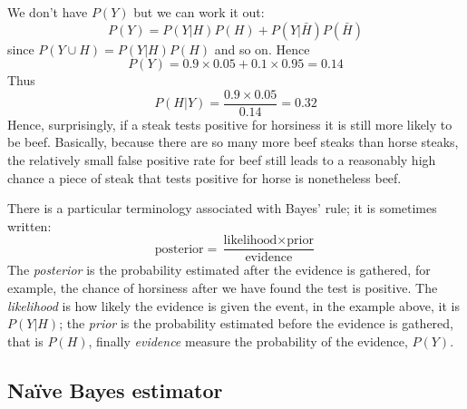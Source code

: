 \documentclass[11pt,a4paper]{scrartcl}
\begin{document}
We don't have $P(Y)$ but we can work it out:
\begin{equation}
P(Y)=P(Y|H)P(H)+P(Y|\bar{H})P(\bar{H})
\end{equation}
since $P(Y\cup H)=P(Y|H)P(H)$ and so on. Hence
\begin{equation}
P(Y)=0.9\times 0.05 + 0.1\times 0.95=0.14
\end{equation}
Thus
\begin{equation}
P(H|Y)=\frac{0.9\times 0.05}{0.14}=0.32
\end{equation}
Hence, surprisingly, if a steak tests positive for horsiness it is
still more likely to be beef. Basically, because there are so many
more beef steaks than horse steaks, the relatively small false
positive rate for beef still leads to a reasonably high chance a piece
of steak that tests positive for horse is nonetheless beef.

There is a particular terminology associated with Bayes' rule; it is
sometimes written:
\begin{equation}
\mbox{posterior}=\frac{\mbox{likelihood}\times \mbox{prior}}{\mbox{evidence}}
\end{equation}
The \textsl{posterior} is the probability estimated after the evidence
is gathered, for example, the chance of horsiness after we have found
the test is positive.  The \textsl{likelihood} is how likely the
evidence is given the event, in the example above, it is $P(Y|H)$; the
\textsl{prior} is the probability estimated before the evidence is
gathered, that is $P(H)$, finally \textsl{evidence} measure the
probability of the evidence, $P(Y)$.

\subsection*{Na\"ive Bayes estimator}
\end{document}
